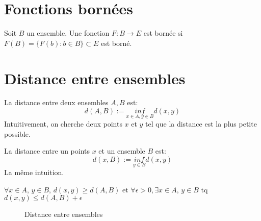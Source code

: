 \section{Fonctions bornées}
\begin{definition}
    Soit $B$ un ensemble. Une fonction  $F: B \to E$ est bornée si $F(B) = \{ F(b): b \in B\} \subset E$ est borné.
\end{definition}
\section{Distance entre ensembles}
\begin{definition}
    La distance entre deux ensembles $A, B$ est:
     \[
         d(A, B) := \underset{x \in A, y \in B}{inf}d(x, y)
    \] 
    Intuitivement, on cherche deux points $x$ et  $y$ tel que la distance est la plus petite possible.
\end{definition}
\begin{definition}
    La distance entre un points $x$ et un ensemble  $B$ est:
     \[
         d(x, B) := \underset{y \in B}{inf}d(x, y)
    \] 
    La même intuition.
\end{definition}
\begin{property}
   $\forall x \in A, \, y \in B, \, d(x, y) \ge d(A, B)$ et $\forall \epsilon > 0, \exists x \in A, \, y \in B$ tq $d(x, y) \le d(A, B) + \epsilon$
\end{property}
\begin{figure}[H]
    \centering
    \caption{Distance entre ensembles}
    \label{fig:distance-entre-ensembles}
\end{figure}
